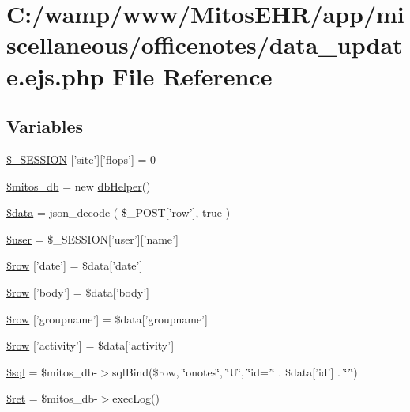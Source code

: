 \hypertarget{miscellaneous_2officenotes_2data__update_8ejs_8php}{\section{\-C\-:/wamp/www/\-Mitos\-E\-H\-R/app/miscellaneous/officenotes/data\-\_\-update.ejs.\-php \-File \-Reference}
\label{miscellaneous_2officenotes_2data__update_8ejs_8php}
}
\subsection*{\-Variables}
\begin{DoxyCompactItemize}
\item 
\hyperlink{miscellaneous_2officenotes_2data__update_8ejs_8php_a99fda8552a3e58235643b79f5af3ded8}{\$\-\_\-\-S\-E\-S\-S\-I\-O\-N} \mbox{[}'site'\mbox{]}\mbox{[}'flops'\mbox{]} = 0
\item 
\hyperlink{miscellaneous_2officenotes_2data__update_8ejs_8php_ab5d961f93efe4e2e8d8374f01dd6c65a}{\$mitos\-\_\-db} = new \hyperlink{classdb_helper}{db\-Helper}()
\item 
\hyperlink{miscellaneous_2officenotes_2data__update_8ejs_8php_a6efc15b5a2314dd4b5aaa556a375c6d6}{\$data} = json\-\_\-decode ( \$\-\_\-\-P\-O\-S\-T\mbox{[}'row'\mbox{]}, true )
\item 
\hyperlink{miscellaneous_2officenotes_2data__update_8ejs_8php_a598ca4e71b15a1313ec95f0df1027ca5}{\$user} = \$\-\_\-\-S\-E\-S\-S\-I\-O\-N\mbox{[}'user'\mbox{]}\mbox{[}'name'\mbox{]}
\item 
\hyperlink{miscellaneous_2officenotes_2data__update_8ejs_8php_a00cef09db665c491099e0754691dde2e}{\$row} \mbox{[}'date'\mbox{]} = \$data\mbox{[}'date'\mbox{]}
\item 
\hyperlink{miscellaneous_2officenotes_2data__update_8ejs_8php_abfa083185dbcb265fcba9aeecceb0b8e}{\$row} \mbox{[}'body'\mbox{]} = \$data\mbox{[}'body'\mbox{]}
\item 
\hyperlink{miscellaneous_2officenotes_2data__update_8ejs_8php_a488a83d63cb6f5d9d30028466b499787}{\$row} \mbox{[}'groupname'\mbox{]} = \$data\mbox{[}'groupname'\mbox{]}
\item 
\hyperlink{miscellaneous_2officenotes_2data__update_8ejs_8php_a451ec54fca28dee6d377a2ae931d892f}{\$row} \mbox{[}'activity'\mbox{]} = \$data\mbox{[}'activity'\mbox{]}
\item 
\hyperlink{miscellaneous_2officenotes_2data__update_8ejs_8php_a047170d6020a882807665812a27e2525}{\$sql} = \$mitos\-\_\-db-\/$>$sql\-Bind(\$row, \char`\"{}onotes\char`\"{}, \char`\"{}\-U\char`\"{}, \char`\"{}id='\char`\"{} . \$data\mbox{[}'id'\mbox{]} . \char`\"{}'\char`\"{})
\item 
\hyperlink{miscellaneous_2officenotes_2data__update_8ejs_8php_affd9e3eb0aad0a7ca42912cd925f148c}{\$ret} = \$mitos\-\_\-db-\/$>$exec\-Log()
\end{DoxyCompactItemize}


